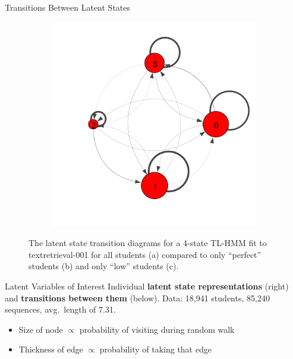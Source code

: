 \documentclass[final,t]{beamer}
\newcommand{\vsp}[0]{\vspace{0.21in}}
\newcommand{\textretrieval}{textretrieval-001}
\begin{document}
\begin{frame}[fragile]
\begin{columns}[t]
\begin{column}{0.6\textwidth}
\begin{block}{Transitions Between Latent States}
\begin{figure}
\begin{subfigure}[t]{0.32\textwidth}
            \caption{\label{fig:trans-perfect}}
          \end{subfigure}%
          \begin{subfigure}[t]{0.32\textwidth}
            \includegraphics[width=\textwidth,trim={0 2cm 0 0cm}]{../../figures/trans-comp/trans-low.png}
            \caption{\label{fig:trans-low}}
          \end{subfigure}
          \caption{The latent state transition diagrams for a 4-state TL-HMM fit to
            \protect\textretrieval{} for all students (a) compared to only ``perfect''
          students (b) and only ``low'' students (c).}
          \label{fig:trans-comp}
        \end{figure}
      \end{block}
      \vsp{}
      \begin{block}{Latent Variables of Interest}
        Individual \textbf{latent state representations} (right) and
        \textbf{transitions between them} (below). Data: 18,941 students,
        85,240 sequences, avg.\ length of 7.31.
        \begin{itemize}
          \item Size of node $\propto$ probability of visiting during
            random walk
          \item Thickness of edge $\propto$ probability of taking that edge

\end{itemize}
\end{block}
\end{column}
\end{columns}
\end{frame}
\end{document}
